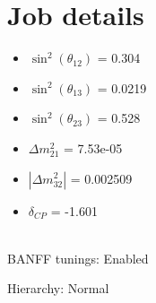 \documentclass[10pt,a4paper]{article}
\begin{document}
\section*{Job details}


\begin{minipage}[t]{0.5\textwidth}
\begin{itemize}
\item[] $\sin^2(\theta_{12})$ = 0.304
\item[] $\sin^2(\theta_{13})$ = 0.0219
\item[] $\sin^2(\theta_{23})$ = 0.528
\item[] $\Delta m^2_{21}$ = 7.53e-05
\item[] $|\Delta m^2_{32}|$ = 0.002509
\item[] $\delta_{CP}$ = -1.601
\end{itemize}
\end{minipage}
\\



BANFF tunings: Enabled

Hierarchy: Normal
\end{document}
